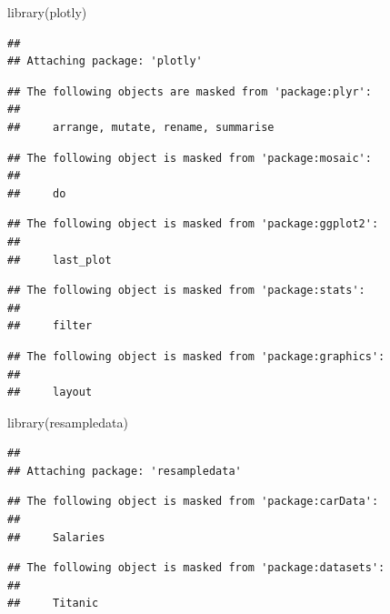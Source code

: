 \documentclass[
]{article}
\newenvironment{Shaded}{\begin{snugshade}}{\end{snugshade}}
\newcommand{\FunctionTok}[1]{\textcolor[rgb]{0.00,0.00,0.00}{#1}}
\newcommand{\NormalTok}[1]{#1}
\begin{document}
\begin{Shaded}
\begin{Highlighting}[]
\FunctionTok{library}\NormalTok{(plotly)}
\end{Highlighting}
\end{Shaded}

\begin{verbatim}
## 
## Attaching package: 'plotly'
\end{verbatim}

\begin{verbatim}
## The following objects are masked from 'package:plyr':
## 
##     arrange, mutate, rename, summarise
\end{verbatim}

\begin{verbatim}
## The following object is masked from 'package:mosaic':
## 
##     do
\end{verbatim}

\begin{verbatim}
## The following object is masked from 'package:ggplot2':
## 
##     last_plot
\end{verbatim}

\begin{verbatim}
## The following object is masked from 'package:stats':
## 
##     filter
\end{verbatim}

\begin{verbatim}
## The following object is masked from 'package:graphics':
## 
##     layout
\end{verbatim}

\begin{Shaded}
\begin{Highlighting}[]
\FunctionTok{library}\NormalTok{(resampledata)}
\end{Highlighting}
\end{Shaded}

\begin{verbatim}
## 
## Attaching package: 'resampledata'
\end{verbatim}

\begin{verbatim}
## The following object is masked from 'package:carData':
## 
##     Salaries
\end{verbatim}

\begin{verbatim}
## The following object is masked from 'package:datasets':
## 
##     Titanic
\end{verbatim}
\end{document}
